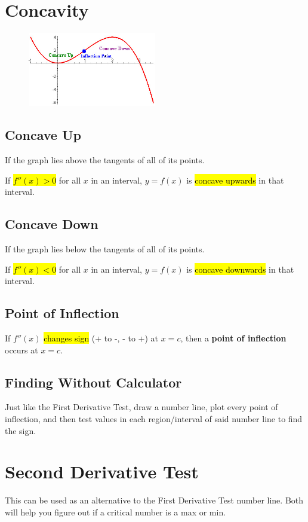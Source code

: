 \documentclass[a4paper,12pt]{article}
\begin{document}
\pagebreak

\section{Concavity}
\begin{figure}[H]
    \centering
    \includegraphics[width=0.50\textwidth]{concave}
\end{figure}

\subsection{Concave Up}
If the graph lies above the tangents of all of its points.

If \hl{$f''(x) > 0$} for all $x$ in an interval, $y = f(x)$ is \hl{concave upwards} in that interval.

\subsection{Concave Down}
If the graph lies below the tangents of all of its points.

If \hl{$f''(x) < 0$} for all $x$ in an interval, $y = f(x)$ is \hl{concave downwards} in that interval.

\subsection{Point of Inflection}
If $f''(x)$ \hl{changes sign} (+ to -, - to +) at $x = c$, then a \textbf{point of inflection} occurs at $x = c$.

\subsection{Finding Without Calculator}
Just like the First Derivative Test, draw a number line, plot every point of inflection, and then test values in each region/interval of said number line to find the sign.

\pagebreak

\section{Second Derivative Test}
This can be used as an alternative to the First Derivative Test number line. Both will help you figure out if a critical number is a max or min.
\end{document}
